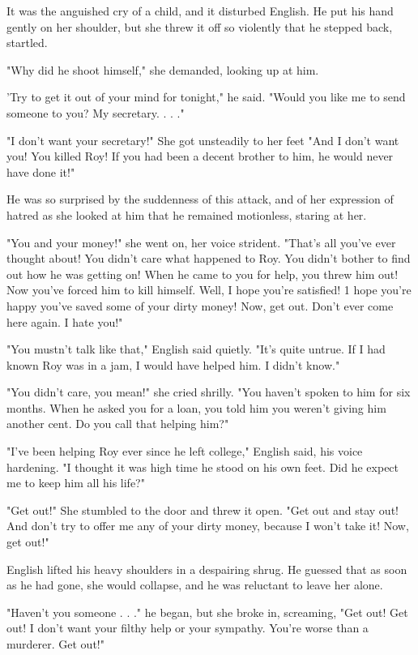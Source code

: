\documentclass{novel}
\begin{document}
It was the anguished cry of a child, and it disturbed English. He put his hand gently on her shoulder, but she threw it off so violently that he stepped back, startled.

"Why did he shoot himself," she demanded, looking up at him.

'Try to get it out of your mind for tonight," he said. "Would you like me to send someone to you? My secretary. . . ."

"I don't want your secretary!" She got unsteadily to her feet "And I don't want you! You killed Roy! If you had been a decent brother to him, he would never have done it!"

He was so surprised by the suddenness of this attack, and of her expression of hatred as she looked at him that he remained motionless, staring at her.

"You and your money!" she went on, her voice strident. "That's all you've ever thought about! You didn't care what happened to Roy. You didn't bother to find out how he was getting on! When he came to you for help, you threw him out! Now you've forced him to kill himself. Well, I hope you're satisfied! 1 hope you're happy you've saved some of your dirty money! Now, get out. Don't ever come here again. I hate you!"

"You mustn't talk like that," English said quietly. "It's quite untrue. If I had known Roy was in a jam, I would have helped him. I didn't know."

"You didn't care, you mean!" she cried shrilly. "You haven't spoken to him for six months. When he asked you for a loan, you told him you weren't giving him another cent. Do you call that helping him?"

"I've been helping Roy ever since he left college," English said, his voice hardening. "I thought it was high time he stood on his own feet. Did he expect me to keep him all his life?"

"Get out!" She stumbled to the door and threw it open. "Get out and stay out! And don't try to offer me any of your dirty money, because I won't take it! Now, get out!"

English lifted his heavy shoulders in a despairing shrug. He guessed that as soon as he had gone, she would collapse, and he was reluctant to leave her alone.

"Haven't you someone . . ." he began, but she broke in, screaming, "Get out! Get out! I don't want your filthy help or your sympathy. You're worse than a murderer. Get out!"
\end{document}
